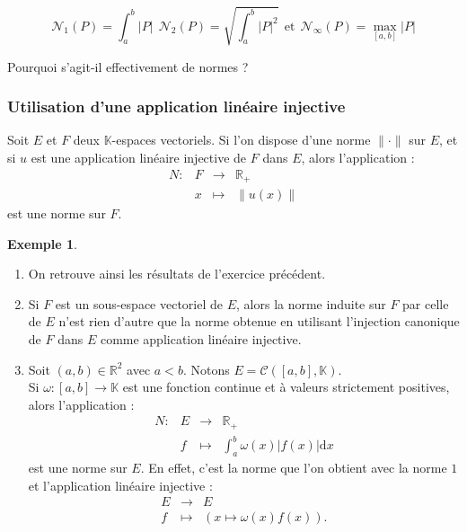 \documentclass[french]{article}
\newcommand{\R}{\mathbb{R}}
\newcommand{\K}{\mathbb{K}}
\renewcommand{\d}{\text{d}}
\theoremstyle{plain}
\theoremstyle{definition}
\newtheorem*{ex}{Exemple}
\theoremstyle{remark}
\begin{document}
$$\mathcal{N}_1(P)=\int_{a}^{b}\lvert P\rvert\ \ \mathcal{N}_2(P)=\sqrt{\int_{a}^{b}\lvert P\rvert^2}\ \ \text{et}\ \ \mathcal{N}_\infty(P)=\underset{[a,b]}{\max}\lvert P\rvert$$

\begin{exo}
	Pourquoi s'agit-il effectivement de normes ?
\end{exo}

\subsubsection*{Utilisation d'une application linéaire injective}

Soit $E$ et $F$ deux $\K$-espaces vectoriels. Si l'on dispose d'une norme $\lVert\cdot\rVert$ sur $E$, et si $u$ est une application linéaire injective de $F$ dans $E$, alors l'application : $$\begin{array}{lrcl}
	N:&F&\longrightarrow&\R_+\\
	&x&\longmapsto&\lVert u(x)\rVert
\end{array}$$ est une norme sur $F$.

\begin{ex}
	\begin{enumerate}
		\item On retrouve ainsi les résultats de l'exercice précédent.
		\item Si $F$ est un sous-espace vectoriel de $E$, alors la norme induite sur $F$ par celle de $E$ n'est rien d'autre que la norme obtenue en utilisant l'injection canonique de $F$ dans $E$ comme application linéaire injective.
		\item Soit $(a,b)\in\R^2$ avec $a<b$. Notons $E=\mathcal{C}([a,b],\K)$.\\
		Si $\omega:[a,b]\to\K$ est une fonction continue et à valeurs strictement positives, alors l'application : $$\begin{array}{lrcl}
			N:&E&\longrightarrow&\R_+\\
			&f&\longmapsto&\displaystyle\int_{a}^{b}\omega(x)\lvert f(x)\rvert \d x
		\end{array}$$ est une norme sur $E$. En effet, c'est la norme que l'on obtient avec la norme $1$ et l'application linéaire injective : $$\begin{array}{rcl}
		E&\longrightarrow&E\\
		f&\longmapsto&(x\mapsto\omega(x)f(x)).
		\end{array}$$
	\end{enumerate}
\end{ex}
\end{document}
